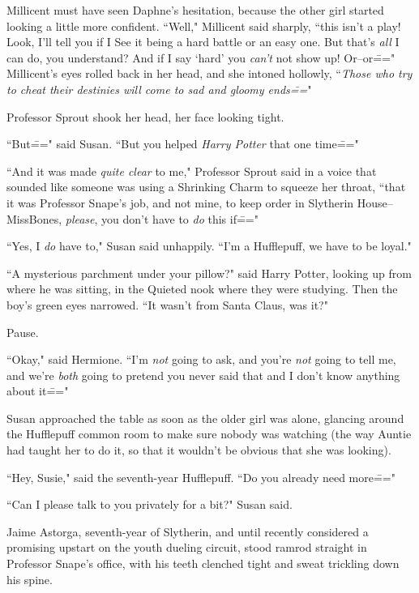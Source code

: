Millicent must have seen Daphne's hesitation, because the other girl started looking a little more confident. ``Well," Millicent said sharply, ``this isn't a play! Look, I'll tell you if I See it being a hard battle or an easy one. But that's \emph{all} I can do, you understand? And if I say `hard' you \emph{can't} not show up! Or\---or\===" Millicent's eyes rolled back in her head, and she intoned hollowly, ``\emph{Those who try to cheat their destinies will come to sad and gloomy ends\===}"

\later

Professor Sprout shook her head, her face looking tight.

``But\===" said Susan. ``But you helped \emph{Harry Potter} that one time\==="

``And it was made \emph{quite clear} to me," Professor Sprout said in a voice that sounded like someone was using a Shrinking Charm to squeeze her throat, ``that it was Professor Snape's job, and not mine, to keep order in Slytherin House\---Miss\?Bones, \emph{please}, you don't have to \emph{do} this if\==="

``Yes, I \emph{do} have to," Susan said unhappily. ``I'm a Hufflepuff, we have to be loyal."

\later

``A mysterious parchment under your pillow?" said Harry Potter, looking up from where he was sitting, in the Quieted nook where they were studying. Then the boy's green eyes narrowed. ``It wasn't from Santa Claus, was it?"

Pause.

``Okay," said Hermione. ``I'm \emph{not} going to ask, and you're \emph{not} going to tell me, and we're \emph{both} going to pretend you never said that and I don't know anything about it\==="

\later

Susan approached the table as soon as the older girl was alone, glancing around the Hufflepuff common room to make sure nobody was watching (the way Auntie had taught her to do it, so that it wouldn't be obvious that she was looking).

``Hey, Susie," said the seventh-year Hufflepuff. ``Do you already need more\==="

``Can I please talk to you privately for a bit?" Susan said.

\later

Jaime Astorga, seventh-year of Slytherin, and until recently considered a promising upstart on the youth dueling circuit, stood ramrod straight in Professor Snape's office, with his teeth clenched tight and sweat trickling down his spine.

